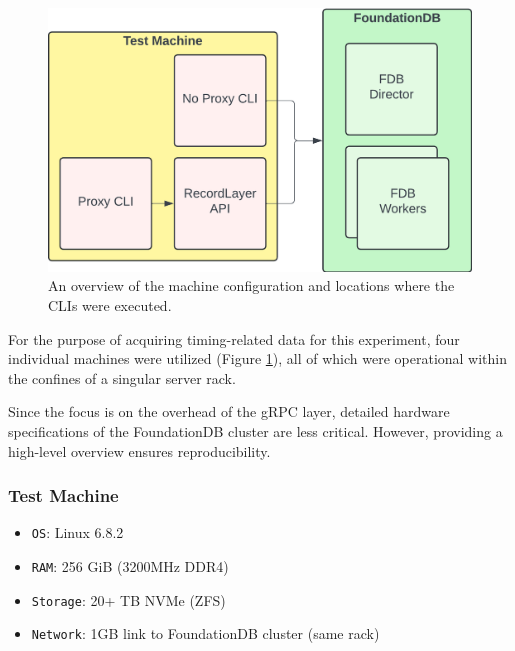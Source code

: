 \documentclass[sigconf]{acmart}
\begin{document}
\begin{figure}[h]
  \centering
  \includegraphics[width=\linewidth]{diag_machines.png}
  \caption{An overview of the machine configuration and locations where the CLIs were executed.}
  \label{fig:diag_machines}
\end{figure}

For the purpose of acquiring timing-related data for this experiment, four individual machines were utilized (Figure \ref{fig:diag_machines}), all of which were operational within the confines of a singular server rack.

Since the focus is on the overhead of the gRPC layer, detailed hardware specifications of the FoundationDB cluster are less critical. However, providing a high-level overview ensures reproducibility.

\subsubsection{Test Machine}

\begin{itemize}
\item {\texttt{OS}}: Linux 6.8.2
\item{\texttt{RAM}}: 256 GiB (3200MHz DDR4)
\item{\texttt{Storage}}: 20+ TB NVMe (ZFS)
\item{\texttt{Network}}: 1GB link to FoundationDB cluster (same rack)
\end{itemize}
\end{document}
